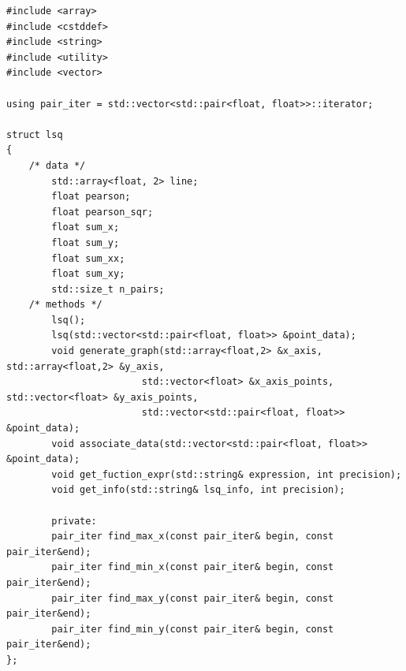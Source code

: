 \documentclass[14pt, letterpaper]{article}
\begin{document}
\begin{spacing}{2.5}
\end{spacing}

\begin{lstlisting}[caption=lsq.h]
#include <array>
#include <cstddef>
#include <string>
#include <utility>
#include <vector>

using pair_iter = std::vector<std::pair<float, float>>::iterator;

struct lsq
{
    /* data */
        std::array<float, 2> line;
        float pearson;
        float pearson_sqr;
        float sum_x;
        float sum_y;
        float sum_xx;
        float sum_xy;
        std::size_t n_pairs;
    /* methods */
        lsq();
        lsq(std::vector<std::pair<float, float>> &point_data);
        void generate_graph(std::array<float,2> &x_axis, std::array<float,2> &y_axis,
                        std::vector<float> &x_axis_points, std::vector<float> &y_axis_points,
                        std::vector<std::pair<float, float>> &point_data);
        void associate_data(std::vector<std::pair<float, float>> &point_data);
        void get_fuction_expr(std::string& expression, int precision);
        void get_info(std::string& lsq_info, int precision);

        private:
        pair_iter find_max_x(const pair_iter& begin, const pair_iter&end);
        pair_iter find_min_x(const pair_iter& begin, const pair_iter&end);
        pair_iter find_max_y(const pair_iter& begin, const pair_iter&end);
        pair_iter find_min_y(const pair_iter& begin, const pair_iter&end);
};
\end{lstlisting}

\begin{spacing}{2.5}
\end{spacing}
\end{document}

